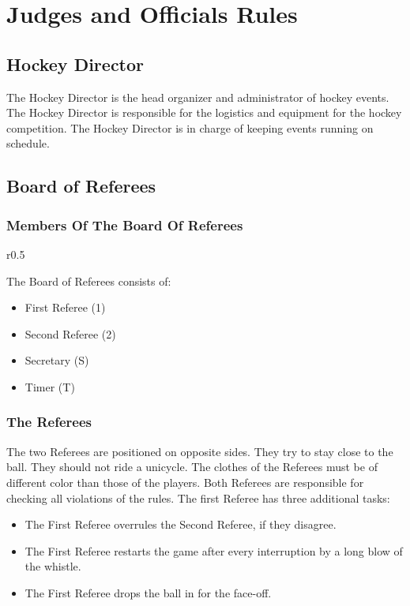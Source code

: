 \chapter{Judges and Officials Rules}

\section{Hockey Director}

The Hockey Director is the head organizer and administrator of hockey events.
The Hockey Director is responsible for the logistics and equipment for the hockey competition.
The Hockey Director is in charge of keeping events running on schedule.

\section{Board of Referees}

\subsection{Members Of The Board Of Referees}
\begin{wrapfigure}[5]{r}{0.5\textwidth}
\centering

\end{wrapfigure}

The Board of Referees consists of:
\begin{itemize}
\item First Referee (1)
\item Second Referee (2)
\item Secretary (S)
\item Timer (T)
\end{itemize}

\subsection{The Referees}
The two Referees are positioned on opposite sides.
They try to stay close to the ball.
They should not ride a unicycle.
The clothes of the Referees must be of different color than those of the players.
Both Referees are responsible for checking all violations of the rules.
The first Referee has three additional tasks:
\begin{itemize}
\item The First Referee overrules the Second Referee, if they disagree.
\item The First Referee restarts the game after every interruption by a long blow of the whistle.
\item The First Referee drops the ball in for the face-off.
\end{itemize}

